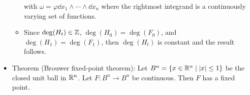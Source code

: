 \documentclass[../notes.tex]{subfiles}
\begin{document}
\begin{itemize}
\begin{itemize}
\begin{equation*}
        \end{equation*}
        with $\omega=\varphi\dd{x_1}\wedge\cdots\wedge\dd{x_n}$ where the rightmost integrand is a continuously varying set of functions.
        \item Since $\deg(H_t)\in\mathbb{Z}$, $\deg(H_0)=\deg(F_0)$, and $\deg(H_1)=\deg(F_1)$, then $\deg(H_t)$ is constant and the result follows.
    \end{itemize}
    \item Theorem (Brouwer fixed-point theorem): Let $B^n=\{x\in\mathbb{R}^n\mid |x|\leq 1\}$ be the closed unit ball in $\mathbb{R}^n$. Let $F:B^n\to B^n$ be continuous. Then $F$ has a fixed point.
    \begin{figure}[H]
        \centering
\end{figure}
\end{itemize}
\end{document}
